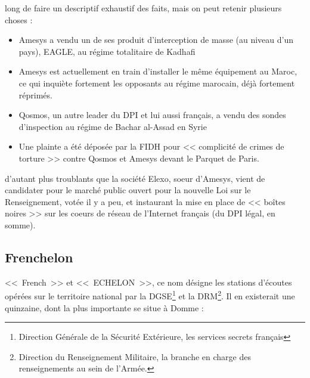  long de faire un descriptif exhaustif des faits,
mais on peut retenir plusieurs choses :

\begin{itemize}
  \item Amesys a vendu un de ses produit d'interception de masse (au niveau
  d'un pays), EAGLE, au régime totalitaire de Kadhafi\autocite{libye}
  \item Amesys est actuellement en train d'installer le même équipement au
  Maroc\autocite{maroc}, ce qui inquiète fortement les opposants au régime
  marocain, déjà fortement réprimés.
  \item Qosmos, un autre leader du DPI et lui aussi français, a vendu des
  sondes d'inspection au régime de Bachar al-Assad en Syrie\autocite{qosmos}
  \item Une plainte a été déposée par la FIDH pour << complicité de crimes de
  torture >> contre Qosmos et Amesys devant le Parquet de Paris.\autocite{fidh}
\end{itemize}

 d'autant plus troublants que la société Elexo, soeur
d'Amesys, vient de candidater\autocite{elexo} pour le marché public ouvert pour la
nouvelle Loi sur le Renseignement, votée il y a peu, et instaurant la mise en place de <<
boîtes noires >> sur les coeurs de réseau de l'Internet français\autocite{LR} (du
DPI légal, en somme).

\newpage
\subsection{Frenchelon}

 <<~French~>> et <<~ECHELON~>>, ce nom
désigne les stations d'écoutes opérées sur le territoire national par la
DGSE\footnote{Direction Générale de la Sécurité Extérieure, les services secrets
français} et la DRM\footnote{Direction du Renseignement Militaire, la branche
en charge des renseignements au sein de l'Armée.}. Il en existerait une
quinzaine, dont la plus importante se situe à Domme :

